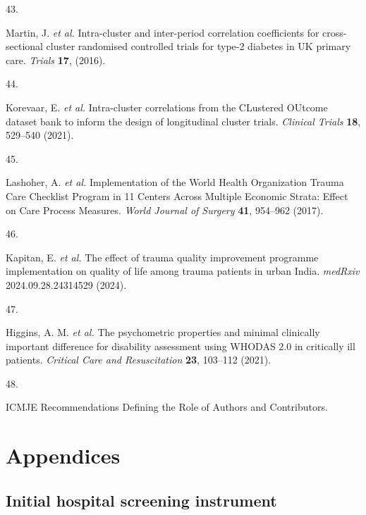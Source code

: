\documentclass[
]{scrartcl}
\newlength{\cslhangindent}
\newlength{\csllabelwidth}
\newlength{\cslentryspacingunit} %
\newenvironment{CSLReferences}[2] %
 {%
  \setlength{\parindent}{0pt}
  \ifodd #1
  \let\oldpar\par
  \def\par{\hangindent=\cslhangindent\oldpar}
  \fi
  \setlength{\parskip}{#2\cslentryspacingunit}
 }%
 {}
\newcommand{\CSLLeftMargin}[1]{\parbox[t]{\csllabelwidth}{#1}}
\newcommand{\CSLRightInline}[1]{\parbox[t]{\linewidth - \csllabelwidth}{#1}\break}
\begin{document}
\begin{CSLReferences}{0}{0}
\leavevmode{}%
\CSLLeftMargin{43. }%
\CSLRightInline{Martin, J. \emph{et al.} Intra-cluster and inter-period
correlation coefficients for cross-sectional cluster randomised
controlled trials for type-2 diabetes in UK primary care. \emph{Trials}
\textbf{17}, (2016).}

\leavevmode{}%
\CSLLeftMargin{44. }%
\CSLRightInline{Korevaar, E. \emph{et al.} Intra-cluster correlations
from the CLustered OUtcome dataset bank to inform the design of
longitudinal cluster trials. \emph{Clinical Trials} \textbf{18},
529--540 (2021).}

\leavevmode{}%
\CSLLeftMargin{45. }%
\CSLRightInline{Lashoher, A. \emph{et al.} Implementation of the {World}
{Health} {Organization} {Trauma} {Care} {Checklist} {Program} in 11
{Centers} {Across} {Multiple} {Economic} {Strata}: {Effect} on {Care}
{Process} {Measures}. \emph{World Journal of Surgery} \textbf{41},
954--962 (2017).}

\leavevmode{}%
\CSLLeftMargin{46. }%
\CSLRightInline{Kapitan, E. \emph{et al.} The effect of trauma quality
improvement programme implementation on quality of life among trauma
patients in urban {India}. \emph{medRxiv} 2024.09.28.24314529 (2024).}

\leavevmode{}%
\CSLLeftMargin{47. }%
\CSLRightInline{Higgins, A. M. \emph{et al.} The psychometric properties
and minimal clinically important difference for disability assessment
using {WHODAS} 2.0 in critically ill patients. \emph{Critical Care and
Resuscitation} \textbf{23}, 103--112 (2021).}

\leavevmode{}%
\CSLLeftMargin{48. }%
\CSLRightInline{{ICMJE} {\textbar} {Recommendations} {\textbar}
{Defining} the {Role} of {Authors} and {Contributors}.}

\end{CSLReferences}

\hypertarget{appendices}{%
\section{Appendices}\label{appendices}}

\hypertarget{sec-appendix-hospital-screening-instrument}{%
\subsection{Initial hospital screening
instrument}\label{sec-appendix-hospital-screening-instrument}}
\end{document}
